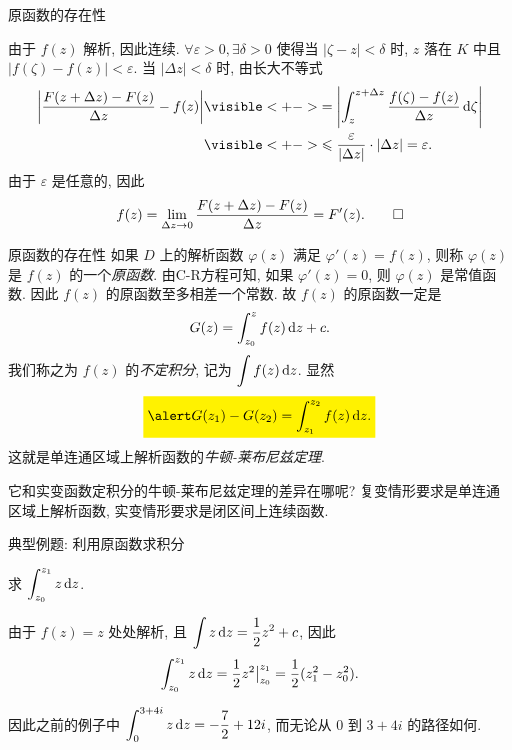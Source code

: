 \begin{frame}{原函数的存在性}
\begin{proofe}
由于 $f(z)$ 解析, 因此连续.
\onslide<+->
$\forall\varepsilon>0,\exists\delta>0$ 使得当 $|\zeta-z|<\delta$ 时, $z$ 落在 $K$ 中且 $|f(\zeta)-f(z)|<\varepsilon$.
\onslide<+->
当 $|\Delta z|<\delta$ 时, 由长大不等式
\begin{align*}
\abs{\frac{F(z+\Delta z)-F(z)}{\Delta z}-f(z)}
&\visible<+->{=\abs{\int_z^{z+\Delta z}\frac{f(\zeta)-f(z)}{\Delta z}\diff \zeta}}\\
&\visible<+->{\le\frac{\varepsilon}{|\Delta z|}\cdot|\Delta z|=\varepsilon.}
\end{align*}
\onslide<+->
由于 $\varepsilon$ 是任意的, 因此
\[f(z)=\lim_{\Delta z\to 0}\frac{F(z+\Delta z)-F(z)}{\Delta z}=F'(z).\qedhere\]
\end{proofe}
\end{frame}


\begin{frame}{原函数的存在性}
\onslide<+->
如果 $D$ 上的解析函数 $\varphi(z)$ 满足 $\varphi'(z)=f(z)$, 则称 $\varphi(z)$ 是 $f(z)$ 的一个\emph{原函数}.
\onslide<+->
由C-R方程可知, 如果 $\varphi'(z)=0$, 则 $\varphi(z)$ 是常值函数.
\onslide<+->
因此 $f(z)$ 的原函数至多相差一个常数.
\onslide<+->
故 $f(z)$ 的原函数一定是
\[G(z)=\int_{z_0}^zf(z)\,\mathrm{d} z+c.\]
\onslide<+->
我们称之为 $f(z)$ 的\emph{不定积分}, 记为 \emph{$\displaystyle\int f(z)\,\mathrm{d} z$}.
\onslide<+->
显然
\[\aboxeq{G(z_1)-G(z_2)=\int_{z_1}^{z_2}f(z)\diff z.}\]
\onslide<+->
这就是单连通区域上解析函数的\emph{牛顿-莱布尼兹定理}.

\onslide<+->
它和实变函数定积分的牛顿-莱布尼兹定理的差异在哪呢?
\onslide<+->
复变情形要求是\alert{单连通区域上解析函数}, 实变情形要求是\alert{闭区间上连续函数}.
\end{frame}


\begin{frame}{典型例题: 利用原函数求积分}
\begin{example}\vspace{4pt}
求 $\displaystyle\int_{z_0}^{z_1}z\,\mathrm{d} z$.
\end{example}
\begin{solution}
由于 $f(z)=z$ 处处解析,
\onslide<+->
且 $\displaystyle\int z\,\mathrm{d} z=\frac12 z^2+c$,
\onslide<+->
因此
\[\int_{z_0}^{z_1}z\,\mathrm{d} z=\frac12z^2\big|_{z_0}^{z_1}=\frac12(z_1^2-z_0^2).\]
\end{solution}
\onslide<+->
因此之前的例子中 $\displaystyle\int_0^{3+4i}z\,\mathrm{d} z=-\frac72+12i$, 而无论从 $0$ 到 $3+4i$ 的路径如何.
\end{frame}


